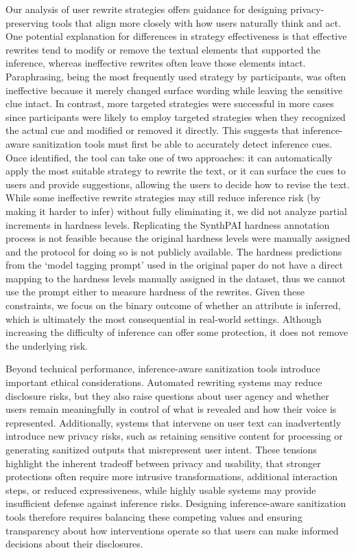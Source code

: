  
Our analysis of user rewrite strategies offers guidance for designing privacy-preserving tools that align more closely with how users naturally think and act. One potential explanation for differences in strategy effectiveness is that effective rewrites tend to modify or remove the textual elements that supported the inference, whereas ineffective rewrites often leave those elements intact. Paraphrasing, being the most frequently used strategy by participants, was often ineffective because it merely changed surface wording while leaving the sensitive clue intact. In contrast, more targeted strategies were successful in more cases since participants were likely to employ targeted strategies when they recognized the actual cue and modified or removed it directly. This suggests that inference-aware sanitization tools must first be able to accurately detect inference cues. Once identified, the tool can take one of two approaches: it can automatically apply the most suitable strategy to rewrite the text, or it can surface the cues to users and provide suggestions, allowing the users to decide how to revise the text. While some ineffective rewrite strategies may still reduce inference risk (by making it harder to infer) without fully eliminating it, we did not analyze partial increments in hardness levels. Replicating the SynthPAI hardness annotation process is not feasible because the original hardness levels were manually assigned and the protocol for doing so is not publicly available. %
The hardness predictions from the `model tagging prompt' used in the original paper do not have a direct mapping to the hardness levels manually assigned in the dataset, thus we cannot use the prompt either to measure hardness of the rewrites.
Given these constraints, we focus on the binary outcome of whether an attribute is inferred, which is ultimately the most consequential in real-world settings. Although increasing the difficulty of inference can offer some protection, it does not remove the underlying risk.

Beyond technical performance, inference-aware sanitization tools introduce important ethical considerations. Automated rewriting systems may reduce disclosure risks, but they also raise questions about user agency and whether users remain meaningfully in control of what is revealed and how their voice is represented. Additionally, systems that intervene on user text can inadvertently introduce new privacy risks, such as retaining sensitive content for processing or generating sanitized outputs that misrepresent user intent. These tensions highlight the inherent tradeoff between privacy and usability, that stronger protections often require more intrusive transformations, additional interaction steps, or reduced expressiveness, while highly usable systems may provide insufficient defense against inference risks. Designing inference-aware sanitization tools therefore requires balancing these competing values and ensuring transparency about how interventions operate so that users can make informed decisions about their disclosures.


